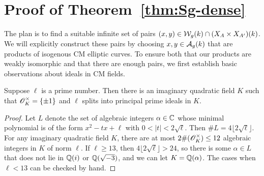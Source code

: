 \documentclass{amsart}
\begin{document}




\section{Proof of Theorem~\ref{thm:Sg-dense}}
\label{sec:step-2}


The plan is to find a suitable infinite set of pairs $(x,y) \in \mathcal{W}_g(k) \cap (X_A \times X_{A'})(k)$. We will explicitly construct these pairs by choosing $x,y \in \mathcal{A}_g(k)$ that are products of isogenous CM elliptic curves. To ensure both that our products are weakly isomorphic and that there are enough pairs, we first establish basic observations about ideals in CM fields.
\begin{lemma}\label{lem:silly}
  Suppose $\ell$ is a prime number. Then there is an imaginary quadratic field $K$ such that $\mathscr{O}_K^\times = \{\pm 1\}$ and $\ell$ splits into principal prime ideals in $K$.
\end{lemma}
\begin{proof}
  Let $L$ denote the set of algebraic integers $\alpha \in \mathbb{C}$ whose minimal polynomial is of the form $x^2 - tx + \ell$ with $0 < |t| < 2\sqrt{\ell}$.
  Then $\#L = 4\lfloor 2\sqrt{\ell} \rfloor$.
  For any imaginary quadratic field $K$, there are at most $2\#(\mathscr{O}_K^\times) \leq 12$ algebraic integers in $K$ of norm $\ell$.
  If $\ell \geq 13$, then $4\lfloor 2\sqrt{\ell} \rfloor > 24$, so there is some $\alpha \in L$ that does not lie in $\mathbb{Q}(i)$ or $\mathbb{Q}(\sqrt{-3})$, and we can let
   $K = \mathbb{Q}(\alpha)$.
  The cases when $\ell < 13$ can be checked by hand.
\end{proof}
\end{document}

